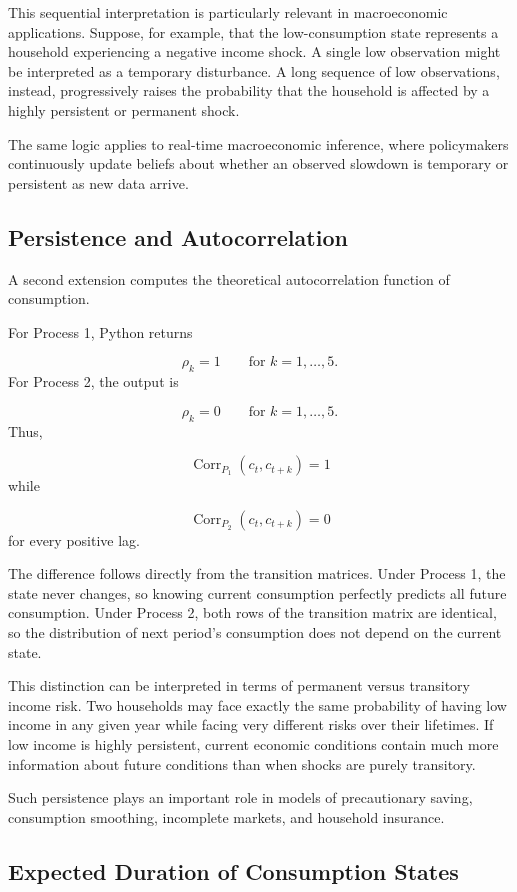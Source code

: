 \documentclass[11pt]{article}
\begin{document}
This sequential interpretation is particularly relevant in macroeconomic
applications. Suppose, for example, that the low-consumption state represents a
household experiencing a negative income shock. A single low observation might
be interpreted as a temporary disturbance. A long sequence of low observations,
instead, progressively raises the probability that the household is affected by
a highly persistent or permanent shock.

The same logic applies to real-time macroeconomic inference, where policymakers
continuously update beliefs about whether an observed slowdown is temporary or
persistent as new data arrive.

\subsection*{Persistence and Autocorrelation}

A second extension computes the theoretical autocorrelation function of
consumption.

For Process 1, Python returns

\[
\rho_k=1
\qquad
\text{for }k=1,\ldots,5.
\]
For Process 2, the output is

\[
\rho_k=0
\qquad
\text{for }k=1,\ldots,5.
\]
Thus,

\[
\boxed{
\operatorname{Corr}_{P_1}(c_t,c_{t+k})=1
}
\]
while

\[
\boxed{
\operatorname{Corr}_{P_2}(c_t,c_{t+k})=0
}
\]
for every positive lag.

The difference follows directly from the transition matrices. Under Process 1,
the state never changes, so knowing current consumption perfectly predicts all
future consumption. Under Process 2, both rows of the transition matrix are
identical, so the distribution of next period's consumption does not depend on
the current state.

This distinction can be interpreted in terms of permanent versus transitory
income risk. Two households may face exactly the same probability of having low
income in any given year while facing very different risks over their lifetimes.
If low income is highly persistent, current economic conditions contain much
more information about future conditions than when shocks are purely
transitory.

Such persistence plays an important role in models of precautionary saving,
consumption smoothing, incomplete markets, and household insurance.

\subsection*{Expected Duration of Consumption States}
\end{document}
